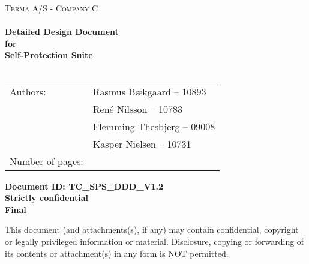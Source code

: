 \documentclass[Main]{subfiles}
\begin{document}
\begin{center}

\textsc{\Large Terma A/S - Company C}\\[0.5cm]


\HRule \\[0.4cm]

{ \huge \bfseries Detailed Design Document}\\[0.4cm]
{ \huge \bfseries for}\\[0.4cm] 
{ \huge \bfseries Self-Protection Suite}\\[0.4cm]

\HRule \\[1.5cm]


\begin{tabular}{p{}|p{}}
\hline 
Authors: & Rasmus Bækgaard -- 10893\\ & René Nilsson -- 10783\\ &Flemming Thesbjerg -- 09008\\ &Kasper Nielsen -- 10731\\ 
\hline 
Number of pages: & \pageref{LastPage} \\
\hline 
\end{tabular} 

\textbf{\Large Document ID: TC\_SPS\_DDD\_V1.2}\\
\textbf{\Large Strictly confidential}\\
\textbf{\Large Final}

This document (and attachments(s), if any) may contain confidential, copyright or legally privileged information or material.
Disclosure, copying or forwarding of its contents or attachment(s) in any form is NOT permitted.
\end{center}
\end{document}
